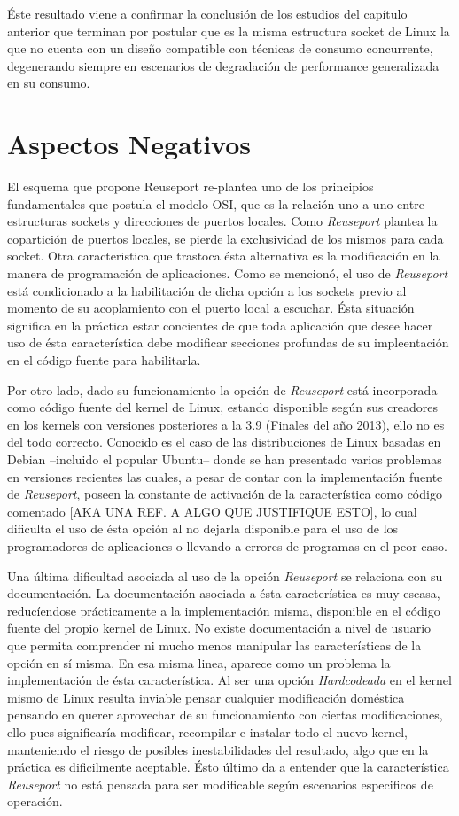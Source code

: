Éste resultado viene a confirmar la conclusión de los estudios del capítulo anterior que terminan por postular que es la misma estructura socket de Linux la que no cuenta con un diseño compatible con técnicas de consumo concurrente, degenerando siempre en escenarios de degradación de performance generalizada en su consumo.

\section{Aspectos Negativos}

El esquema que propone Reuseport re-plantea uno de los principios fundamentales que postula el modelo OSI, que es la relación uno a uno entre estructuras sockets y direcciones de puertos locales. Como \emph{Reuseport} plantea la copartición de puertos locales, se pierde la exclusividad de los mismos para cada socket. Otra caracteristica que trastoca ésta alternativa es la modificación en la manera de programación de aplicaciones. Como se mencionó, el uso de \emph{Reuseport} está condicionado a la habilitación de dicha opción a los sockets previo al momento de su acoplamiento con el puerto local a escuchar. Ésta situación significa en la práctica estar concientes de que toda aplicación que desee hacer uso de ésta característica debe modificar secciones profundas de su impleentación en el código fuente para habilitarla.

Por otro lado, dado su funcionamiento la opción de \emph{Reuseport} está incorporada como código fuente del kernel de Linux, estando disponible según sus creadores en los kernels con versiones posteriores a la 3.9 (Finales del año 2013), ello no es del todo correcto. Conocido es el caso de las distribuciones de Linux basadas en Debian --incluido el popular Ubuntu-- donde se han presentado varios problemas en versiones recientes las cuales, a pesar de contar con la implementación fuente de \emph{Reuseport}, poseen la constante de activación de la característica como código comentado [AKA UNA REF. A ALGO QUE JUSTIFIQUE ESTO], lo cual dificulta el uso de ésta opción al no dejarla disponible para el uso de los programadores de aplicaciones o llevando a errores de programas en el peor caso.

Una última dificultad asociada al uso de la opción \emph{Reuseport} se relaciona con su documentación. La documentación asociada a ésta característica es muy escasa, reducíendose prácticamente a la implementación misma, disponible en el código fuente del propio kernel de Linux. No existe documentación a nivel de usuario que permita comprender ni mucho menos manipular las características de la opción en sí misma. En esa misma linea, aparece como un problema la implementación de ésta característica. Al ser una opción \emph{Hardcodeada} en el kernel mismo de Linux resulta inviable pensar cualquier modificación doméstica pensando en querer aprovechar de su funcionamiento con ciertas modificaciones, ello pues significaría modificar, recompilar e instalar todo el nuevo kernel, manteniendo el riesgo de posibles inestabilidades del resultado, algo que en la práctica es dificilmente aceptable. Ésto último da a entender que la característica \emph{Reuseport} no está pensada para ser modificable según escenarios especificos de operación.